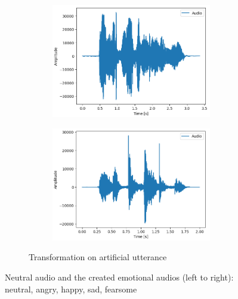 \documentclass[11pt]{article}
\begin{document}
\begin{figure}
\begin{subfigure}{.5\textwidth}
\begin{subfigure}{.18\textwidth}
  \label{fig:sfig2}
\end{subfigure}
\begin{subfigure}{.18\textwidth}
  \centering
  \includegraphics[width=\linewidth]{Bilder/art_sad.png}
  \label{fig:sfig2}
\end{subfigure}
\begin{subfigure}{.18\textwidth}
  \centering
  \includegraphics[width=\linewidth]{Bilder/art_fear.png}
  \label{fig:sfig2}
\end{subfigure}
\caption{Transformation on artificial utterance}
\end{subfigure}
\caption{Neutral audio and the created emotional audios (left to right): neutral, angry, happy, sad, fearsome}
\label{fig:fig}
\end{figure}
\end{document}
